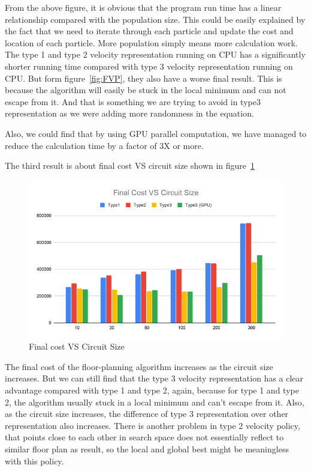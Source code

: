 \documentclass{article}
\begin{document}
From the above figure, it is obvious that the program run time has a linear relationship compared with the population size. This could be easily explained by the fact that we need to iterate through each particle and update the cost and location of each particle. More population simply means more calculation work. The type 1 and type 2 velocity representation running on CPU has a significantly shorter running time compared with type 3 velocity representation running on CPU. But form figure~\ref{fig:FVP}, they also have a worse final result. This is because the algorithm will easily be stuck in the local minimum and can not escape from it. And that is something we are trying to avoid in type3 representation as we were adding more randomness in the equation.

Also, we could find that by using GPU parallel computation, we have managed to reduce the calculation time by a factor of 3X or more.

The third result is about final cost VS circuit size shown in figure~\ref{fig:FVS}

\begin{figure}[H]
\centering
\includegraphics[width=1\linewidth]{CostVSsize.png}
\caption{Final cost VS Circuit Size}
\label{fig:FVS}
\end{figure}

The final cost of the floor-planning algorithm increases as the circuit size increases. But we can still find that the type 3 velocity representation has a clear advantage compared with type 1 and type 2, again, because for type 1 and type 2, the algorithm usually stuck in a local minimum and can't escape from it. Also, as the circuit size increases, the difference of type 3 representation over other representation also increases.  There is another problem in type 2 velocity policy, that points close to each other in search space does not essentially reflect to similar floor plan as result, so the local and global best might be meaningless with this policy.
\end{document}
